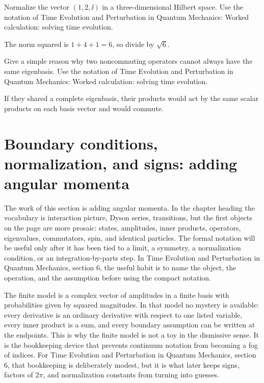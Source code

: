 \begin{exercise}
Normalize the vector \((1,2,\ii)\) in a three-dimensional Hilbert space.  Use the notation of Time Evolution and Perturbation in Quantum Mechanics: Worked calculation: solving time evolution.
\begin{answer}
The norm squared is \(1+4+1=6\), so divide by \(\sqrt6\).
\end{answer}
\end{exercise}

\begin{exercise}
Give a simple reason why two noncommuting operators cannot always have the same eigenbasis.  Use the notation of Time Evolution and Perturbation in Quantum Mechanics: Worked calculation: solving time evolution.
\begin{answer}
If they shared a complete eigenbasis, their products would act by the same scalar products on each basis vector and would commute.
\end{answer}
\end{exercise}



\section{Boundary conditions, normalization, and signs: adding angular momenta}

The work of this section is adding angular momenta.  In the chapter heading the vocabulary is interaction picture, Dyson series, transitions, but the first objects on the page are more prosaic: states, amplitudes, inner products, operators, eigenvalues, commutators, spin, and identical particles.  The formal notation will be useful only after it has been tied to a limit, a symmetry, a normalization condition, or an integration-by-parts step.  In Time Evolution and Perturbation in Quantum Mechanics, section 6, the useful habit is to name the object, the operation, and the assumption before using the compact notation.

The finite model is a complex vector of amplitudes in a finite basis with probabilities given by squared magnitudes.  In that model no mystery is available: every derivative is an ordinary derivative with respect to one listed variable, every inner product is a sum, and every boundary assumption can be written at the endpoints.  This is why the finite model is not a toy in the dismissive sense.  It is the bookkeeping device that prevents continuum notation from becoming a fog of indices.  For Time Evolution and Perturbation in Quantum Mechanics, section 6, that bookkeeping is deliberately modest, but it is what later keeps signs, factors of \(2\pi\), and normalization constants from turning into guesses.

